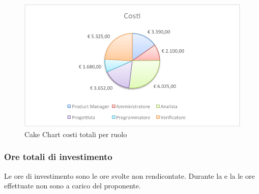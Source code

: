 				\begin{figure}[H]\centering
					\includegraphics[width=\textwidth]{PianoDiProgetto/Pics/ChartTotCosti.pdf}
					\caption{Cake Chart costi totali per ruolo}
				\end{figure}
		\subsubsection{Ore totali di investimento}
		Le ore di investimento sono le ore svolte non rendicontate. Durante la  e la  le ore effettuate non sono a carico del proponente.
